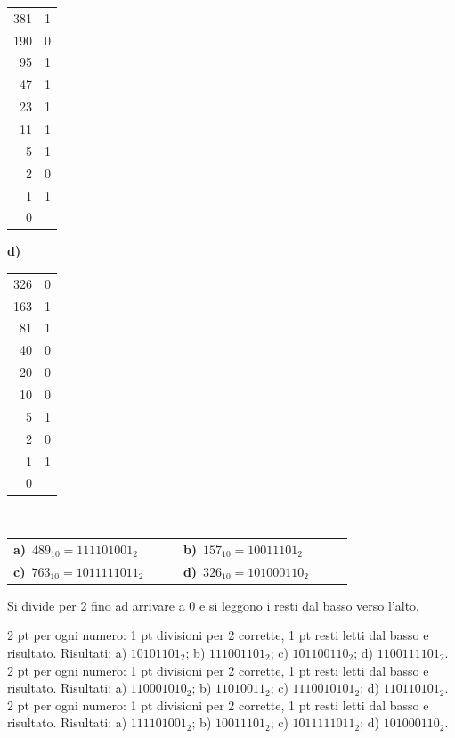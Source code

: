 \begin{esercizio}[8]
\begin{solution}
{\begin{minipage}[t]{0.24\linewidth}
{\begin{tabular}{r|l}
    381 & 1\\
    190 & 0\\
    95 & 1\\
    47 & 1\\
    23 & 1\\
    11 & 1\\
    5 & 1\\
    2 & 0\\
    1 & 1\\
    0 & \\
  \end{tabular}}
  \end{minipage}\hfill
  \begin{minipage}[t]{0.24\linewidth}
  \textbf{d)}\\[2pt]
  {\small\renewcommand{\arraystretch}{1.0}\begin{tabular}{r|l}
    326 & 0\\
    163 & 1\\
    81 & 1\\
    40 & 0\\
    20 & 0\\
    10 & 0\\
    5 & 1\\
    2 & 0\\
    1 & 1\\
    0 & \\
  \end{tabular}}
  \end{minipage}\\[6pt]
\par\smallskip\noindent\hspace*{1em}\begin{tabular}{@{}p{0.42\linewidth}p{0.42\linewidth}@{}}
  \textbf{a)}~$489_{10} = 111101001_2$ & \textbf{b)}~$157_{10} = 10011101_2$\\[4pt]
  \textbf{c)}~$763_{10} = 1011111011_2$ & \textbf{d)}~$326_{10} = 101000110_2$
\end{tabular}\par\smallskip
  Si divide per 2 fino ad arrivare a 0 e si leggono i resti dal basso verso l'alto.}
  \criterioABC
  {2 pt per ogni numero: 1 pt divisioni per 2 corrette, 1 pt resti letti dal basso e risultato. Risultati: a) $10101101_2$; b) $111001101_2$; c) $101100110_2$; d) $1100111101_2$.}
  {2 pt per ogni numero: 1 pt divisioni per 2 corrette, 1 pt resti letti dal basso e risultato. Risultati: a) $110001010_2$; b) $11010011_2$; c) $1110010101_2$; d) $110110101_2$.}
  {2 pt per ogni numero: 1 pt divisioni per 2 corrette, 1 pt resti letti dal basso e risultato. Risultati: a) $111101001_2$; b) $10011101_2$; c) $1011111011_2$; d) $101000110_2$.}
\end{solution}
\end{esercizio}
